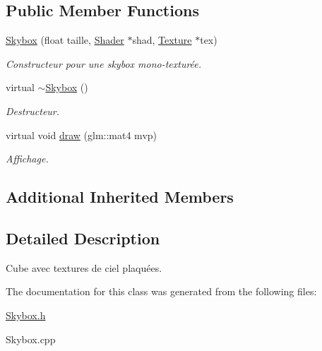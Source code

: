 \subsection*{Public Member Functions}
\begin{DoxyCompactItemize}
\item 
\hypertarget{classSkybox_abe8add7195fe6ac462d83f5afb9d26a6}{\hyperlink{classSkybox_abe8add7195fe6ac462d83f5afb9d26a6}{Skybox} (float taille, \hyperlink{classShader}{Shader} $\ast$shad, \hyperlink{classTexture}{Texture} $\ast$tex)}\label{classSkybox_abe8add7195fe6ac462d83f5afb9d26a6}

\begin{DoxyCompactList}\small\item\em Constructeur pour une skybox mono-\/texturée. \end{DoxyCompactList}\item 
\hypertarget{classSkybox_a62ad4c6b4b1965a0a6d8536a50d4c090}{virtual \hyperlink{classSkybox_a62ad4c6b4b1965a0a6d8536a50d4c090}{$\sim$\+Skybox} ()}\label{classSkybox_a62ad4c6b4b1965a0a6d8536a50d4c090}

\begin{DoxyCompactList}\small\item\em Destructeur. \end{DoxyCompactList}\item 
\hypertarget{classSkybox_a07b12f1abc7c7b344ae5db0e3245d95a}{virtual void \hyperlink{classSkybox_a07b12f1abc7c7b344ae5db0e3245d95a}{draw} (glm\+::mat4 mvp)}\label{classSkybox_a07b12f1abc7c7b344ae5db0e3245d95a}

\begin{DoxyCompactList}\small\item\em Affichage. \end{DoxyCompactList}\end{DoxyCompactItemize}
\subsection*{Additional Inherited Members}


\subsection{Detailed Description}
Cube avec textures de ciel plaquées. 

The documentation for this class was generated from the following files\+:\begin{DoxyCompactItemize}
\item 
\hyperlink{Skybox_8h}{Skybox.\+h}\item 
Skybox.\+cpp\end{DoxyCompactItemize}
